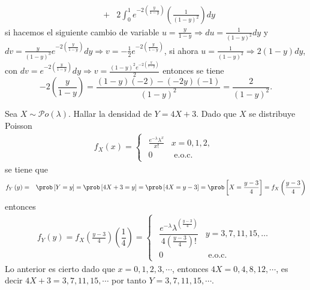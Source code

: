 \begin{Ejem}
\begin{eqnarray*}
&+& 2 \int_{0}^{1} e^{-2\left(\frac{y}{1-y}\right)}\left(\frac{1}{\left(1-y\right)^{2}}\right) dy
\end{eqnarray*}
si hacemos el siguiente cambio de variable
$u=\frac{y}{1-y}\Rightarrow du=\frac{1}{\left(1-y\right)^{2}} dy$ y $dv= \frac{y}{\left(1-y\right)^3}e^{-2\left(\frac{y}{1-y}\right)} dy \Rightarrow v=-\frac{1}{2}e^{-2\left(\frac{y}{1-y}\right)}$, si ahora
$u=\frac{1}{\left(1-y\right)^{2}} \Rightarrow 2\left(1-y\right)dy$, con $dv= e^{-2\left(\frac{y}{1-y}\right)} dy \Rightarrow v= \frac{\left(1-y\right)^2 e^{-2\left(\frac{y}{1-y}\right)}}{2}$ entonces se tiene
$$-2\left(\frac{y}{1-y}\right)=\frac{\left(1-y\right)\left(-2\right)-\left(-2y\right)\left(-1\right)}{\left(1-y\right)^2}= \frac{2}{\left(1-y\right)^2}.$$
\end{Ejem}

\begin{Ejem}
Sea $X \sim \mathcal{P}o\left(\lambda\right)$. Hallar la densidad de $Y=4X+3$. Dado que $X$ se distribuye Poisson
\begin{eqnarray*}
f_{X}\left(x\right)=
\begin{cases}
\begin{array}{lc}
\frac{e^{-\lambda}\lambda^{x}}{x!} & x=0,1,2,\\
0 & \textrm{ e.o.c.}
\end{array}
\end{cases}
\end{eqnarray*}
se tiene que
\begin{eqnarray*}
f_{Y}\left(y\right)&=& \prob\left[Y=y\right]= \prob\left[4X+3=y\right]=\prob\left[4X=y-3\right]=\prob\left[X=\frac{y-3}{4}\right]=f_{X}\left(\frac{y-3}{4}\right)\end{eqnarray*}entonces
\begin{eqnarray*}
f_{Y}\left(y\right)=f_{X}\left(\frac{y-3}{4}\right)\left(\dfrac{1}{4}\right)= 
\begin{cases}
\begin{array}{lc}
\dfrac{e^{-\lambda} \lambda^{\left(\frac{y-3}{4}\right)}}{4\left(\frac{y-3}{4}\right)!} & y=3,7,11,15,\ldots\\
0 & \textrm{ e.o.c.}
\end{array}
\end{cases}
\end{eqnarray*}
Lo anterior es cierto dado que 
$x=0,1,2,3,\cdots$, entonces $4X=0,4,8,12, \cdots$, es decir
$4X+3=3,7,11,15, \cdots$ por tanto $Y=3,7,11,15, \cdots$. 
\end{Ejem}

